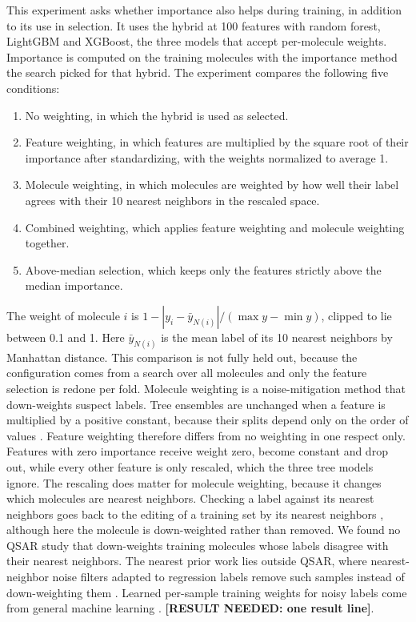 This experiment asks whether importance also helps during training, in addition to its use in selection. It uses the hybrid at 100 features with random forest, LightGBM and XGBoost, the three models that accept per-molecule weights. Importance is computed on the training molecules with the importance method the search picked for that hybrid. The experiment compares the following five conditions:
\begin{enumerate}[leftmargin=*]
    \item No weighting, in which the hybrid is used as selected.
    \item Feature weighting, in which features are multiplied by the square root of their importance after standardizing, with the weights normalized to average 1.
    \item Molecule weighting, in which molecules are weighted by how well their label agrees with their 10 nearest neighbors in the rescaled space.
    \item Combined weighting, which applies feature weighting and molecule weighting together.
    \item Above-median selection, which keeps only the features strictly above the median importance.
\end{enumerate}
The weight of molecule $i$ is $1 - |y_i - \bar y_{N(i)}| / (\max y - \min y)$, clipped to lie between 0.1 and 1. Here $\bar y_{N(i)}$ is the mean label of its 10 nearest neighbors by Manhattan distance. This comparison is not fully held out, because the configuration comes from a search over all molecules and only the feature selection is redone per fold. Molecule weighting is a noise-mitigation method that down-weights suspect labels. Tree ensembles are unchanged when a feature is multiplied by a positive constant, because their splits depend only on the order of values \citep{Hastie2009}. Feature weighting therefore differs from no weighting in one respect only. Features with zero importance receive weight zero, become constant and drop out, while every other feature is only rescaled, which the three tree models ignore. The rescaling does matter for molecule weighting, because it changes which molecules are nearest neighbors. Checking a label against its nearest neighbors goes back to the editing of a training set by its nearest neighbors \citep{Wilson1972}, although here the molecule is down-weighted rather than removed. We found no QSAR study that down-weights training molecules whose labels disagree with their nearest neighbors. The nearest prior work lies outside QSAR, where nearest-neighbor noise filters adapted to regression labels remove such samples instead of down-weighting them \citep{Martin2021}. Learned per-sample training weights for noisy labels come from general machine learning \citep{shu2019metaweightnet}. \textbf{[RESULT NEEDED: one result line]}.

